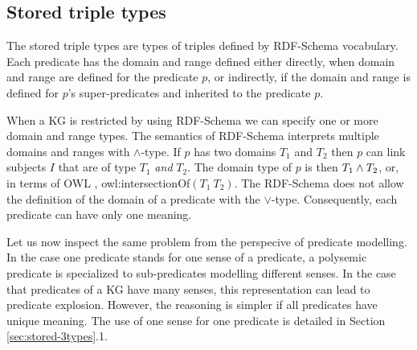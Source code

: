 \documentclass[runningheads]{llncs}
\newcommand{\memo}[1]{}
\begin{document}
\memo{Moreover, the types $T$ that are derived by the above rule are
  minimal in the sense that given the information provided, i.e., the
  types of $t$'s components, their interpretations are minimal
  possible comparing them to the interpretations of all other derived
  types of $t$.}






\subsection{Stored triple types\label{sec:stored-3types}}

The stored triple types are types of triples defined by RDF-Schema
\cite{rdfschema} vocabulary. Each predicate has the domain and range
defined either directly, when domain and range are defined for the
predicate $p$, or indirectly, if the domain and range is defined for
$p$'s super-predicates and inherited to the predicate $p$.

When a KG is restricted by using RDF-Schema we can specify one or more
domain and range types. The semantics of RDF-Schema
\cite{rdfsemantics} interprets multiple domains and ranges with
$\land$-type. If $p$ has two domains $T_1$ and $T_2$ then $p$ can link
subjects $I$ that are of type $T_1$ \emph{and} $T_2$. The domain type
of $p$ is then $T_1\land\/T_2$, or, in terms of OWL \cite{owl},
owl:intersectionOf$(T_1\ T_2)$. The RDF-Schema does not allow the
definition of the domain of a predicate with the
$\lor$-type. Consequently, each predicate can have only one meaning.
  
\memo{
However, we often need a semantics of a predicate that allows the
definition of a predicate with multiple senses, depending on the
context of the predicate. One reason for adding $\lor$-types to a KG
can be the expressive power of KG. These KGs use owl:unionOf and
owl:intersectionOf to define more complex types of predicates.
Examples of such KGs are schema.org, EPCIS, DBpedia (in few cases) and
model transformation tools. Further, KGs that can define contexts and
use contextual reasoning also use $\land$ and $\lor$-types. The
contexts are often defined by RDF named graphs, e.g., DBpedia
\cite{Auer2007} and Linked Data \cite{ld-site}. Examples of KGs that
can define and use contexts are Cyc \cite{cyc}, Scone
\cite{Fahlman2011} and RACER \cite{Haarslev2012}.}

Let us now inspect the same problem from the perspecive of predicate
modelling. In the case one predicate stands for one sense of a
predicate, a polysemic predicate is specialized to sub-predicates
modelling different senses. In the case that predicates of a KG have
many senses, this representation can lead to predicate
explosion. However, the reasoning is simpler if all predicates have
unique meaning. %
The use of one sense for one predicate is detailed in Section
\ref{sec:stored-3types}.1.
\end{document}
